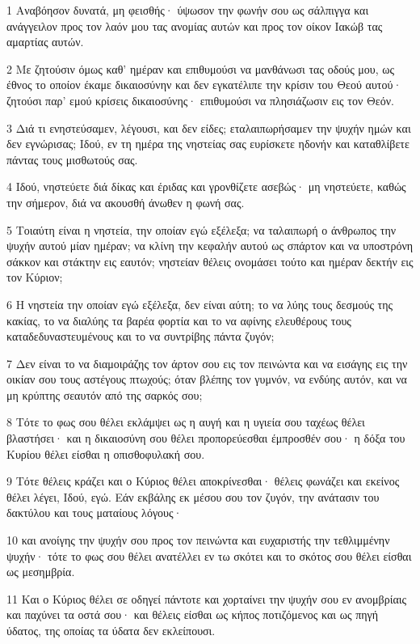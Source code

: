 \par 1 Αναβόησον δυνατά, μη φεισθής· ύψωσον την φωνήν σου ως σάλπιγγα και ανάγγειλον προς τον λαόν μου τας ανομίας αυτών και προς τον οίκον Ιακώβ τας αμαρτίας αυτών.
\par 2 Με ζητούσιν όμως καθ' ημέραν και επιθυμούσι να μανθάνωσι τας οδούς μου, ως έθνος το οποίον έκαμε δικαιοσύνην και δεν εγκατέλιπε την κρίσιν του Θεού αυτού· ζητούσι παρ' εμού κρίσεις δικαιοσύνης· επιθυμούσι να πλησιάζωσιν εις τον Θεόν.
\par 3 Διά τι ενηστεύσαμεν, λέγουσι, και δεν είδες; εταλαιπωρήσαμεν την ψυχήν ημών και δεν εγνώρισας; Ιδού, εν τη ημέρα της νηστείας σας ευρίσκετε ηδονήν και καταθλίβετε πάντας τους μισθωτούς σας.
\par 4 Ιδού, νηστεύετε διά δίκας και έριδας και γρονθίζετε ασεβώς· μη νηστεύετε, καθώς την σήμερον, διά να ακουσθή άνωθεν η φωνή σας.
\par 5 Τοιαύτη είναι η νηστεία, την οποίαν εγώ εξέλεξα; να ταλαιπωρή ο άνθρωπος την ψυχήν αυτού μίαν ημέραν; να κλίνη την κεφαλήν αυτού ως σπάρτον και να υποστρόνη σάκκον και στάκτην εις εαυτόν; νηστείαν θέλεις ονομάσει τούτο και ημέραν δεκτήν εις τον Κύριον;
\par 6 Η νηστεία την οποίαν εγώ εξέλεξα, δεν είναι αύτη; το να λύης τους δεσμούς της κακίας, το να διαλύης τα βαρέα φορτία και το να αφίνης ελευθέρους τους καταδεδυναστευμένους και το να συντρίβης πάντα ζυγόν;
\par 7 Δεν είναι το να διαμοιράζης τον άρτον σου εις τον πεινώντα και να εισάγης εις την οικίαν σου τους αστέγους πτωχούς; όταν βλέπης τον γυμνόν, να ενδύης αυτόν, και να μη κρύπτης σεαυτόν από της σαρκός σου;
\par 8 Τότε το φως σου θέλει εκλάμψει ως η αυγή και η υγιεία σου ταχέως θέλει βλαστήσει· και η δικαιοσύνη σου θέλει προπορεύεσθαι έμπροσθέν σου· η δόξα του Κυρίου θέλει είσθαι η οπισθοφυλακή σου.
\par 9 Τότε θέλεις κράζει και ο Κύριος θέλει αποκρίνεσθαι· θέλεις φωνάζει και εκείνος θέλει λέγει, Ιδού, εγώ. Εάν εκβάλης εκ μέσου σου τον ζυγόν, την ανάτασιν του δακτύλου και τους ματαίους λόγους·
\par 10 και ανοίγης την ψυχήν σου προς τον πεινώντα και ευχαριστής την τεθλιμμένην ψυχήν· τότε το φως σου θέλει ανατέλλει εν τω σκότει και το σκότος σου θέλει είσθαι ως μεσημβρία.
\par 11 Και ο Κύριος θέλει σε οδηγεί πάντοτε και χορταίνει την ψυχήν σου εν ανομβρίαις και παχύνει τα οστά σου· και θέλεις είσθαι ως κήπος ποτιζόμενος και ως πηγή ύδατος, της οποίας τα ύδατα δεν εκλείπουσι.
